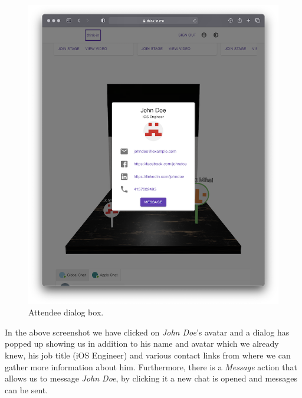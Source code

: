 \begin{figure}[H]
	\includegraphics[width=\textwidth,keepaspectratio]{images/business_logic/main_page_signed_in_attendee_dialog.png}
	\caption{Attendee dialog box.}
	\label{figure:website-attendee-dialog-box}
\end{figure}

In the above screenshot we have clicked on \textit{John Doe}'s avatar and a dialog has popped up showing us in addition to his name and avatar which we already knew, his job title (iOS Engineer) and various contact links from where we can gather more information about him. Furthermore, there is a \textit{Message} action that allows us to message \textit{John Doe}, by clicking it a new chat is opened and messages can be sent.

